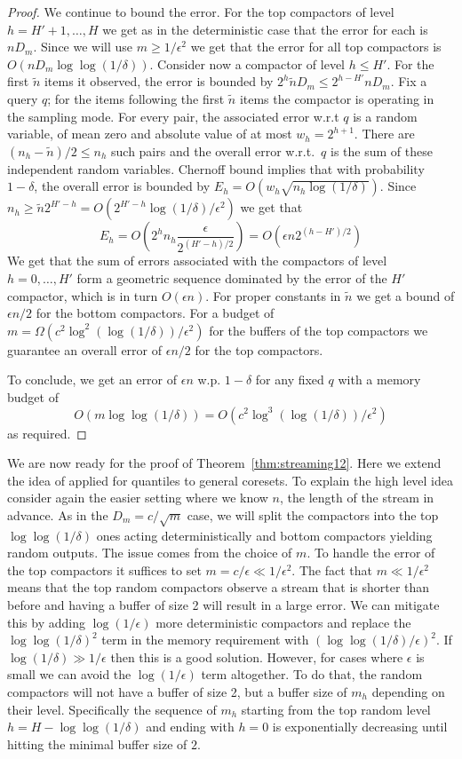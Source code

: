 \documentclass[anon,12pt]{colt2019} %
\newcommand{\eps}{\epsilon}
\begin{document}
{\begin{proof}
We continue to bound the error. For the top compactors of level $h=H'+1,\ldots,H$ we get as in the deterministic case that the error for each is $n D_m$. Since we will use $m \geq 1/\eps^2$ we get that the error for all top compactors is $O(nD_m\log\log(1/\delta))$.
Consider now a compactor of level $h \leq H'$. For the first $\tilde{n}$ items it observed, the error is bounded by $2^h\tilde{n}D_m \leq 2^{h-H'}nD_m$. Fix a query $q$; for the items following the first $\tilde{n}$ items the compactor is operating in the sampling mode. For every pair, the associated error w.r.t $q$ is a random variable, of mean zero and absolute value of at most $w_h=2^{h+1}$. There are $(n_h-\tilde{n})/2 \leq n_h$ such pairs and the overall error w.r.t.\ $q$ is the sum of these independent random variables. Chernoff bound implies that with probability $1-\delta$, the overall error is bounded by $E_h = O(w_h\sqrt{n_h\log(1/\delta)})$. Since $n_h \geq \tilde{n}2^{H'-h} = O(2^{H'-h}\log(1/\delta)/\eps^2)$ we get that
$$ E_h = O\left(2^h n_h\frac{\eps}{2^{(H'-h)/2}}\right) = O(\eps n 2^{(h-H')/2}) $$
We get that the sum of errors associated with the compactors of level $h=0,\ldots,H'$ form a geometric sequence dominated by the error of the $H'$ compactor, which is in turn $O(\eps n)$. For proper constants in $\tilde{n}$ we get a bound of $\eps n/2$ for the bottom compactors. For a budget of $m = \Omega(c^2\log^2(\log(1/\delta))/\eps^2)$ for the buffers of the top compactors we guarantee an overall error of $\eps n/2$ for the top compactors. 

To conclude, we get an error of $\eps n$ w.p. $1-\delta$ for any fixed $q$ with a memory budget of
$$O(m\log\log(1/\delta)) = O\left(c^2\log^3(\log(1/\delta))/\eps^2\right)$$
as required.
\end{proof}

We are now ready for the proof of Theorem~\ref{thm:streaming12}. Here we extend the idea of \cite{DBLP:conf/focs/KarninLL16} applied for quantiles to general coresets. To explain the high level idea consider again the easier setting where we know $n$, the length of the stream in advance. As in the $D_m=c/\sqrt{m}$ case, we will split the compactors into the top $\log\log(1/\delta)$ ones acting deterministically and bottom compactors yielding random outputs. The issue comes from the choice of $m$. To handle the error of the top compactors it suffices to set $m=c/\eps \ll 1/\eps^2$. The fact that $m \ll 1/\eps^2$ means that the top random compactors observe a stream that is shorter than before and having a buffer of size 2 will result in a large error. We can mitigate this by adding $\log(1/\eps)$ more deterministic compactors and replace the $\log\log(1/\delta)^2$ term in the memory requirement with $\left(\log\log(1/\delta)/\eps\right)^2$. If $\log(1/\delta) \gg 1/\eps$ then this is a good solution. However, for cases where $\eps$ is small we can avoid the $\log(1/\eps)$ term altogether. To do that, the random compactors will not have a buffer of size 2, but a buffer size of $m_h$ depending on their level. Specifically the sequence of $m_h$ starting from the top random level $h= H-\log\log(1/\delta)$ and ending with $h=0$ is exponentially decreasing until hitting the minimal buffer size of $2$.

}
\end{document}

